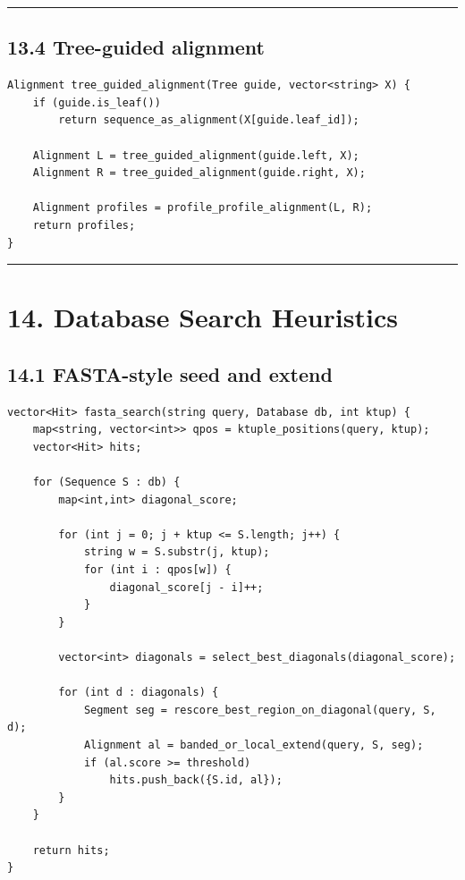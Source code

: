 \documentclass[11pt]{article}
\begin{document}
\begin{center}\rule{0.5\linewidth}{0.5pt}\end{center}

\subsection{13.4 Tree-guided alignment}\label{tree-guided-alignment}

\begin{verbatim}
Alignment tree_guided_alignment(Tree guide, vector<string> X) {
    if (guide.is_leaf())
        return sequence_as_alignment(X[guide.leaf_id]);

    Alignment L = tree_guided_alignment(guide.left, X);
    Alignment R = tree_guided_alignment(guide.right, X);

    Alignment profiles = profile_profile_alignment(L, R);
    return profiles;
}
\end{verbatim}

\begin{center}\rule{0.5\linewidth}{0.5pt}\end{center}

\section{14. Database Search Heuristics}\label{database-search-heuristics}

\subsection{14.1 FASTA-style seed and extend}\label{fasta-style-seed-and-extend}

\begin{verbatim}
vector<Hit> fasta_search(string query, Database db, int ktup) {
    map<string, vector<int>> qpos = ktuple_positions(query, ktup);
    vector<Hit> hits;

    for (Sequence S : db) {
        map<int,int> diagonal_score;

        for (int j = 0; j + ktup <= S.length; j++) {
            string w = S.substr(j, ktup);
            for (int i : qpos[w]) {
                diagonal_score[j - i]++;
            }
        }

        vector<int> diagonals = select_best_diagonals(diagonal_score);

        for (int d : diagonals) {
            Segment seg = rescore_best_region_on_diagonal(query, S, d);
            Alignment al = banded_or_local_extend(query, S, seg);
            if (al.score >= threshold)
                hits.push_back({S.id, al});
        }
    }

    return hits;
}
\end{verbatim}
\end{document}
